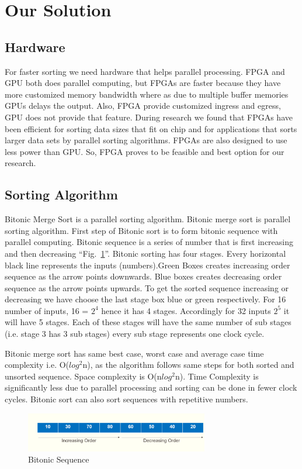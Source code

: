 \documentclass[conference]{IEEEtran}
\begin{document}
\section{Our Solution}

\subsection{Hardware}\label{AA}
For faster sorting we need hardware that helps parallel processing. FPGA and GPU both does parallel computing, but FPGAs are faster because they have more customized memory bandwidth where as due to multiple buffer memories GPUs delays the output. Also, FPGA provide customized ingress and egress, GPU does not provide that feature. During research we found that FPGAs have been efficient for sorting data sizes that fit on chip and for applications that sorts larger data sets by parallel sorting algorithms. FPGAs are also designed to use less power than GPU. So, FPGA proves to be feasible and best option for our research.

\subsection{Sorting Algorithm}
Bitonic Merge Sort is a parallel sorting algorithm. Bitonic merge sort is parallel sorting algorithm. First step of Bitonic sort is to form bitonic sequence with parallel computing. Bitonic sequence is a series of number that is first increasing and then decreasing ``Fig.~\ref{fig1}''. Bitonic sorting has four stages. Every horizontal black line represents the inputs (numbers).Green Boxes creates increasing order sequence as the arrow points downwards. Blue boxes creates decreasing order sequence as the arrow points upwards. To get the sorted sequence increasing or decreasing we have choose the last stage box blue or green respectively. For 16 number of inputs, 16 = \(2^4\) hence it has 4 stages. Accordingly for 32 inputs \(2^5\) it will have 5 stages. Each of these stages will have the same number of sub stages (i.e. stage 3 has 3 sub stages) every sub stage represents one clock cycle.


Bitonic merge sort has same best case, worst case and average case time complexity i.e. O(\(log^2\)n), as the algorithm follows same steps for both sorted and unsorted sequence. Space complexity is O(n\(log^2\)n). Time Complexity is significantly less due to parallel processing and sorting can be done in fewer clock cycles. Bitonic sort can also sort sequences with repetitive numbers. 
\begin{figure}[h!]
  \centering
  \includegraphics[width=8cm]{bitonic sequence.png} 
  \caption{Bitonic Sequence}
  \label{fig1}
 \end{figure}
\end{document}
